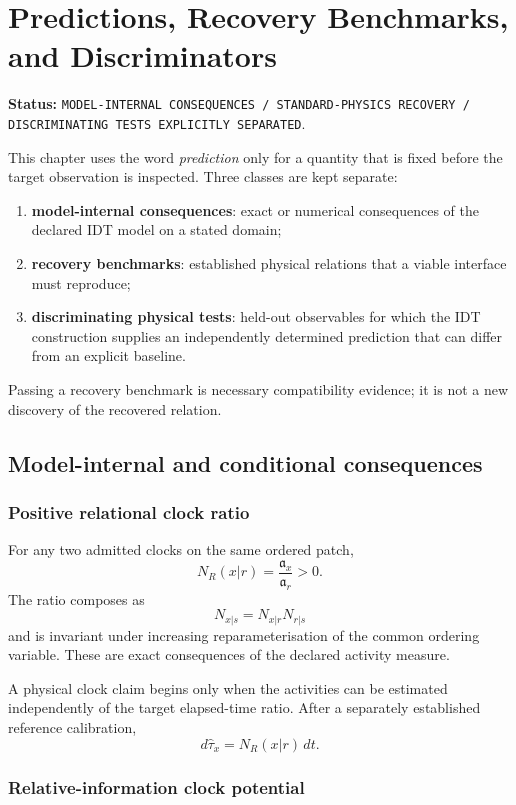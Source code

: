\chapter{Predictions, Recovery Benchmarks, and Discriminators}

\noindent\textbf{Status:} \texttt{MODEL-INTERNAL CONSEQUENCES / STANDARD-PHYSICS RECOVERY / DISCRIMINATING TESTS EXPLICITLY SEPARATED}.

This chapter uses the word \emph{prediction} only for a quantity that is fixed before the target observation is inspected. Three classes are kept separate:
\begin{enumerate}
\item \textbf{model-internal consequences}: exact or numerical consequences of the declared IDT model on a stated domain;
\item \textbf{recovery benchmarks}: established physical relations that a viable interface must reproduce;
\item \textbf{discriminating physical tests}: held-out observables for which the IDT construction supplies an independently determined prediction that can differ from an explicit baseline.
\end{enumerate}
Passing a recovery benchmark is necessary compatibility evidence; it is not a new discovery of the recovered relation.

\section{Model-internal and conditional consequences}

\subsection{Positive relational clock ratio}

For any two admitted clocks on the same ordered patch,
\[
\boxed{
N_R(x|r)=\frac{\mathfrak a_x}{\mathfrak a_r}>0.
}
\]
The ratio composes as
\[
N_{x|s}=N_{x|r}N_{r|s}
\]
and is invariant under increasing reparameterisation of the common ordering variable. These are exact consequences of the declared activity measure.

A physical clock claim begins only when the activities can be estimated independently of the target elapsed-time ratio. After a separately established reference calibration,
\[
d\widehat\tau_x=N_R(x|r)\,dt.
\]

\subsection{Relative-information clock potential}

